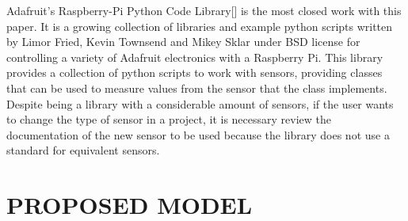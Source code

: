 \documentclass{acm_proc_article-sp}
\begin{document}
Adafruit's Raspberry-Pi Python Code Library[] is the most closed work with this paper. It is a growing collection of libraries and example python scripts written by Limor Fried, Kevin Townsend and Mikey Sklar under BSD license for controlling a variety of Adafruit electronics with a Raspberry Pi.
\newline
\newline
This library provides a collection of python scripts to work with sensors, providing classes that can be used to measure values from the sensor that the class implements. 
\newline
\newline
Despite being a library with a considerable amount of sensors, if the user wants to change the type of sensor in a project, it is necessary review the documentation of the new sensor to be used because the library does not use a standard for equivalent sensors.




\section{PROPOSED MODEL}
\end{document}
